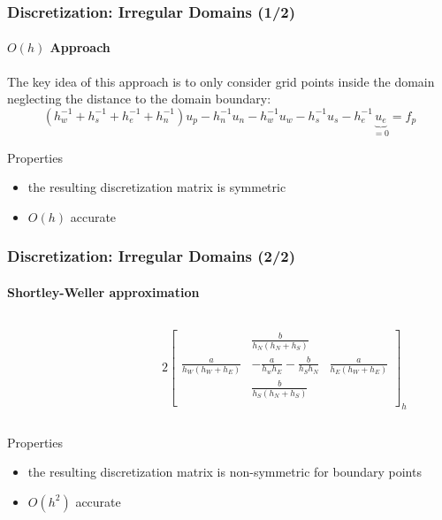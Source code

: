 \documentclass[xcolor=pdftex,table,10pt]{beamer}
\begin{document}
	\begin{frame}
		\frametitle{Discretization: Irregular Domains (1/2)}
		\framesubtitle{$O(h)$ Approach}

		The key idea of this approach is to only consider grid points inside the domain neglecting the distance to the domain boundary:
		\[
			(h_w^{-1}+h_s^{-1}+h_e^{-1}+h_n^{-1})u_p - h_n^{-1} u_n - h_w^{-1} u_w - h_s^{-1} u_s - h_e^{-1} \underbrace{u_e}_{=0} = f_p
		\]

		\vspace{0.5cm}
	
		\begin{alertblock}{Properties}
		\begin{itemize}
			\item the resulting discretization matrix is symmetric
			\item $O(h)$ accurate
		\end{itemize}
		\end{alertblock}

	\end{frame}
	
	\begin{frame}
		\frametitle{Discretization: Irregular Domains (2/2)}
		\framesubtitle{Shortley-Weller approximation}
	
		\begin{columns}
		\begin{column}{4cm}	
			
		\end{column}
		\begin{column}{6.5cm}	
		\small{	
			\[
				2 \begin{bmatrix}
				& \frac{b}{h_N (h_N + h_S)} & \\
				\frac{a}{h_W (h_W + h_E)} & -\frac{a}{h_w h_E} -\frac{b}{h_S h_N} & \frac{a}{h_E (h_W + h_E)} \\
				& \frac{b}{h_S (h_N + h_S)} & \\
				\end{bmatrix}_h
			\] 
		}
		\end{column}
		\end{columns}
		
		\begin{alertblock}{Properties}
		\begin{itemize}
			\item the resulting discretization matrix is non-symmetric for boundary points
			\item $O(h^2)$ accurate
		\end{itemize}
		\end{alertblock}

	\end{frame}
\end{document}
